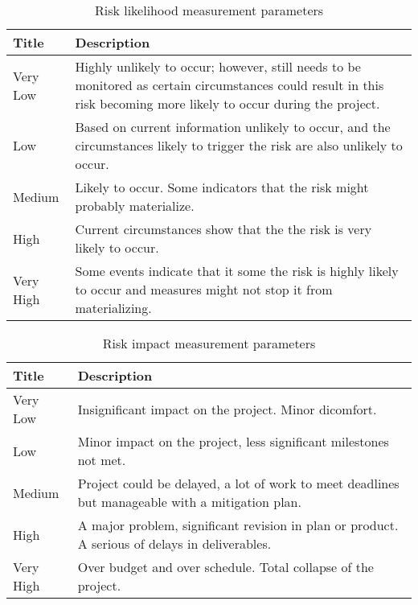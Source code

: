 \begin{center}
    \begin{table}[htb]
    \begin{tabular}{ | l | p{10cm} |}

    \hline
    Title & Description  \\ \hline \hline
    Very Low & Highly unlikely to occur; however, still needs to be monitored as certain circumstances could result
    in this risk becoming more likely to occur during the project. \\ \hline
    Low & Based on current information unlikely to occur, and the circumstances likely to trigger the risk are also unlikely to occur. \\ \hline
    Medium & Likely to occur. Some indicators that the risk might probably materialize.  \\ \hline
    High & Current circumstances show that the the risk is very likely to occur. \\ \hline
    Very High & Some events indicate that it some the risk is highly likely to occur and measures might not stop it from materializing.\\ \hline
    \end{tabular}
    \caption{Risk likelihood measurement parameters}
    \label{tab:risk-likelihood}
    \end{table}
    
    \begin{table}[htb]
    \begin{tabular}{|l|p{10cm}|}
    \hline
    Title & Description \\ \hline \hline
    Very Low & Insignificant impact on the project. Minor dicomfort. \\ \hline
    Low & Minor impact on the project, less significant milestones not met. \\ \hline
    Medium & Project could be delayed, a lot of work to meet deadlines but manageable with a mitigation plan. \\ \hline
    High & A major problem, significant revision in plan or product. A serious of delays in deliverables.\\ \hline
    Very High & Over budget and over schedule. Total collapse of the project. \\ \hline
    \end{tabular}
    \caption{Risk impact measurement parameters}
    \label{tab:risk-impact}
    \end{table}
\end{center}
